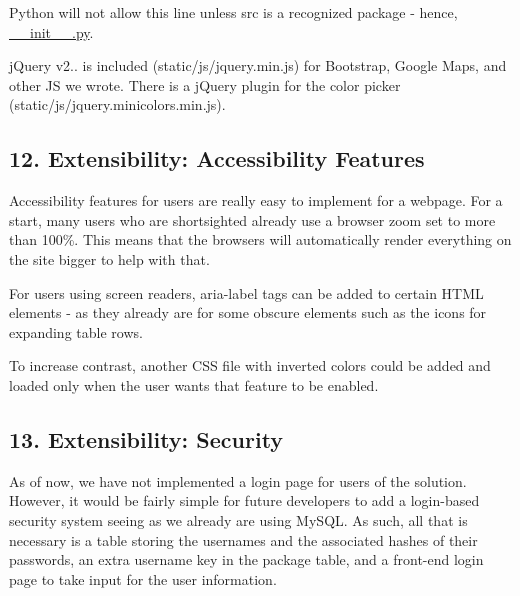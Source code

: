 Python will not allow this line unless {\ttfamily src} is a recognized package -\/ hence, {\ttfamily \hyperlink{____init_____8py}{\+\_\+\+\_\+init\+\_\+\+\_\+.\+py}}.

j\+Query v2.. is included ({\ttfamily static/js/jquery.\+min.\+js}) for Bootstrap, Google Maps, and other JS we wrote. There is a j\+Query plugin for the color picker ({\ttfamily static/js/jquery.\+minicolors.\+min.\+js}).

\subsection*{12. Extensibility\+: Accessibility Features}

Accessibility features for users are really easy to implement for a webpage. For a start, many users who are shortsighted already use a browser zoom set to more than 100\%. This means that the browsers will automatically render everything on the site bigger to help with that.

For users using screen readers, {\ttfamily aria-\/label} tags can be added to certain H\+T\+ML elements -\/ as they already are for some obscure elements such as the icons for expanding table rows.

To increase contrast, another C\+SS file with inverted colors could be added and loaded only when the user wants that feature to be enabled.

\subsection*{13. Extensibility\+: Security}

As of now, we have not implemented a login page for users of the solution. However, it would be fairly simple for future developers to add a login-\/based security system seeing as we already are using My\+S\+QL. As such, all that is necessary is a table storing the usernames and the associated hashes of their passwords, an extra username key in the package table, and a front-\/end login page to take input for the user information. 